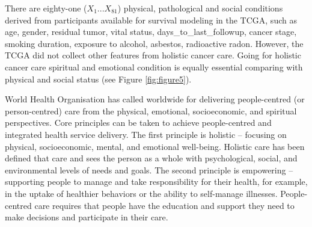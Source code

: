\documentclass[12pt, a4paper]{article}
\begin{document}

There are eighty-one ($X_1 ... X_{81}$) physical, pathological and social conditions derived from participants available for survival modeling in the TCGA, 
such as age, gender, residual tumor, vital status, days\_to\_last\_followup, cancer stage, smoking duration, exposure to alcohol, asbestos, radioactive radon. 
However, the TCGA did not collect other features from holistic cancer care.
Going for holistic cancer care\cite{Mehta2019}\cite{Iftikhar2021} spiritual and emotional condition is equally essential comparing with physical and social status (see Figure \ref{fig:figure5}).

%
World Health Organisation has called worldwide for delivering people-centred (or person-centred) care from the physical, emotional, socioeconomic, and spiritual perspectives\cite{WHO2015}\cite{Ling-ChengMong2021}.
Core principles can be taken to achieve people-centred and integrated health service delivery. 
The first principle is holistic – focusing on physical, socioeconomic, mental, and emotional well-being. 
Holistic care has been defined that care and sees the person as a whole with psychological, social, and environmental levels of needs and goals.
The second principle is empowering – supporting people to manage and take responsibility for their health,
for example, in the uptake of healthier behaviors or the ability to self-manage illnesses.
People-centred care requires that people have the education and support they need to make decisions and participate in their care.
\end{document}
